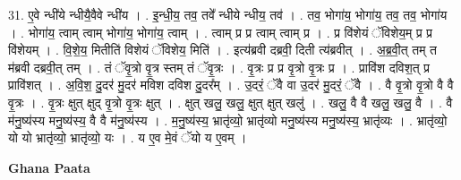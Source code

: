\documentclass[17pt]{extarticle}
\begin{document}
31. ए॒वे न्धी॑ये न्धीयै॒वैवे न्धी॑य । . इ॒न्धी॒य॒ तव॒ तवे᳚ न्धीये न्धीय॒ तव॑ । . तव॒ भोगा॑य॒ भोगा॑य॒ तव॒ तव॒ भोगा॑य । . भोगा॑य॒ त्वाम् त्वाम् भोगा॑य॒ भोगा॑य॒ त्वाम् । . त्वाम् प्र प्र त्वाम् त्वाम् प्र । . प्र वि॑शेयं ॅविशेय॒म् प्र प्र वि॑शेयम् । . वि॒शे॒य॒ मितीति॑ विशेयं ॅविशेय॒ मिति॑ । . इत्य॑ब्रवी दब्रवी॒ दिती त्य॑ब्रवीत् । . अ॒ब्र॒वी॒त् तम् त म॑ब्रवी दब्रवी॒त् तम् । . तं ॅवृ॒त्रो वृ॒त्र स्तम् तं ॅवृ॒त्रः । . वृ॒त्रः प्र प्र वृ॒त्रो वृ॒त्रः प्र । . प्रावि॑श दविश॒त् प्र प्रावि॑शत् । . अ॒वि॒श॒ दु॒दर॑ मु॒दर॑ मविश दविश दु॒दर᳚म् । . उ॒दरं॒ ॅवै वा उ॒दर॑ मु॒दरं॒ ॅवै । . वै वृ॒त्रो वृ॒त्रो वै वै वृ॒त्रः । . वृ॒त्रः क्षुत् क्षुद् वृ॒त्रो वृ॒त्रः क्षुत् । . क्षुत् खलु॒ खलु॒ क्षुत् क्षुत् खलु॑ । . खलु॒ वै वै खलु॒ खलु॒ वै । . वै म॑नु॒ष्य॑स्य मनु॒ष्य॑स्य॒ वै वै म॑नु॒ष्य॑स्य । . म॒नु॒ष्य॑स्य॒ भ्रातृ॑व्यो॒ भ्रातृ॑व्यो मनु॒ष्य॑स्य मनु॒ष्य॑स्य॒ भ्रातृ॑व्यः । . भ्रातृ॑व्यो॒ यो यो भ्रातृ॑व्यो॒ भ्रातृ॑व्यो॒ यः । . य ए॒व मे॒वं ॅयो य ए॒वम् । \newline

\textbf{Ghana Paata } \newline
\end{document}
